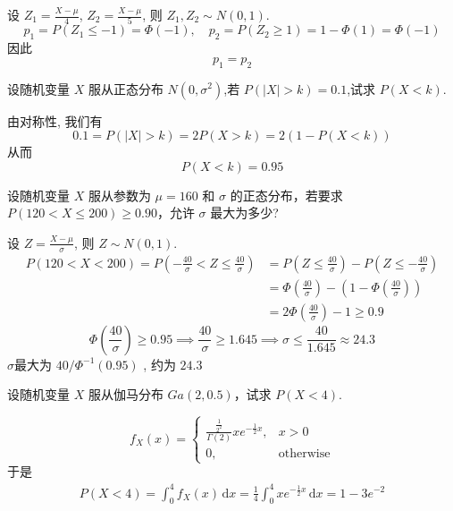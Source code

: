 \documentclass[../main.tex]{subfiles}
\begin{document}
\begin{solution}
   设 \(  Z_1= \frac{X-\mu  }{4 }   \), \(  Z_2= \frac{X-\mu  }{5 }   \), 则 \(  Z_1,Z_2\sim N\left( 0,1 \right)   \). \[
  p_1= P\left( Z_1\le -1 \right)= \Phi \left( -1 \right),\quad p_2= P\left( Z_2\ge 1 \right)= 1-\Phi \left( 1 \right)= \Phi \left( -1 \right)    
  \]   因此 \[
  p_1= p_2
  \]
\end{solution}

\begin{exercise}{}{}
设随机变量 $X$ 服从正态分布 $N(0,\sigma^2)$,若 $P(|X|>k) = 0.1$,试求 $P(X<k)$.
\end{exercise}
\begin{solution}
   由对称性, 我们有 \[
 0.1=  P\left( \left| X \right|> k  \right)= 2P\left( X> k \right)= 2\left( 1-P\left( X< k \right)  \right)   
  \]从而 \[
  P\left( X< k \right)= 0.95 
  \]
\end{solution}

\begin{exercise}{}{}
设随机变量 $X$ 服从参数为 $\mu = 160$ 和 $\sigma$ 的正态分布，若要求 $P(120 < X \leq 200) \geq 0.90$，允许 $\sigma$ 最大为多少?
\end{exercise}
\begin{solution}
  设 \(  Z= \frac{X-\mu  }{ \sigma  }   \), 则 \(  Z\sim N\left( 0,1 \right)   \). \[
  \begin{aligned}
  P\left( 120< X< 200 \right)= P\left( -\frac{40 }{ \sigma  }< Z\le \frac{40 }{ \sigma  }   \right)&= P\left( Z\le \frac{40 }{ \sigma  }  \right)-P\left( Z\le -\frac{40 }{ \sigma  }  \right)    \\ 
   &= \Phi \left( \frac{40 }{ \sigma  }  \right)-\left( 1-\Phi \left( \frac{40 }{ \sigma  }  \right)  \right)\\ 
    &= 2\Phi \left( \frac{40 }{ \sigma  }  \right)-1   \ge 0.9
  \end{aligned} 
  \]\[
  \Phi \left( \frac{40 }{ \sigma  }  \right)\ge 0.95 \implies \frac{40 }{ \sigma  }\ge 1.645\implies  \sigma \le \frac{40 }{1.645 } \approx 24.3
  \] \(   \sigma   \)最大为 \(40/  \Phi ^{-1} \left( 0.95 \right)   \)  , 约为 \(  24.3  \) 
\end{solution}

\begin{exercise}{}{}
设随机变量 $X$ 服从伽马分布 $Ga(2, 0.5)$，试求 $P(X < 4)$.
\end{exercise}
\begin{solution}
   \[
  f_{X}\left( x \right)= \begin{cases} \frac{ \frac{1 }{2^{2} }  }{ \Gamma \left( 2 \right)  } x e^{-\frac{1 }{2 }x },&x> 0\\ 
   0, &\text{otherwise} \end{cases}  
  \]于是 \[
  \begin{aligned}
  P\left( X< 4 \right)=  \int_{0}^{4}f_{X}\left( x \right)\,\mathrm{d} x=\frac{1 }{ 4}   \int_{0}^{4}xe^{-\frac{1 }{2 }x }\,\mathrm{d} x=1-3e^{-2}
  \end{aligned}
  \] 
\end{solution}
\end{document}

